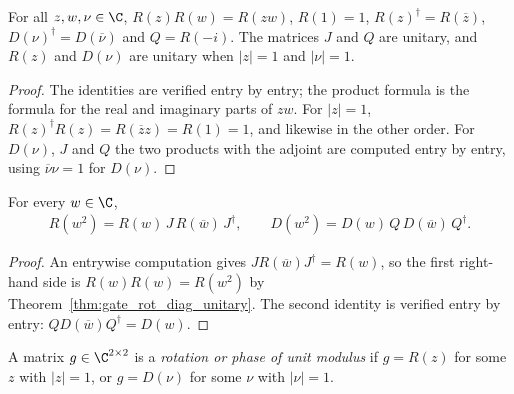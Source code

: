 \begin{theorem}
    \label{thm:gate_rot_diag_unitary}
    \leanok
    For all $z,w,\nu\in\C$,
    $R(z)R(w)=R(zw)$, $R(1)=1$, $R(z)^\dagger=R(\overline z)$,
    $D(\nu)^\dagger=D(\overline\nu)$ and $Q=R(-i)$. The matrices $J$ and $Q$
    are unitary, and $R(z)$ and $D(\nu)$ are unitary when $|z|=1$ and
    $|\nu|=1$.
\end{theorem}
\begin{proof}\leanok
    The identities are verified entry by entry; the product formula is the
    formula for the real and imaginary parts of $zw$. For $|z|=1$,
    $R(z)^\dagger R(z)=R(\overline zz)=R(1)=1$, and likewise in the other
    order. For $D(\nu)$, $J$ and $Q$ the two products with the adjoint are
    computed entry by entry, using $\overline\nu\nu=1$ for $D(\nu)$.
\end{proof}

\begin{theorem}
    \label{thm:gate_sq_commutator}
    \leanok
    For every $w\in\C$,
    \begin{align}
        R(w^2)=R(w)\,J\,R(\overline w)\,J^\dagger,
        \qquad
        D(w^2)=D(w)\,Q\,D(\overline w)\,Q^\dagger.
    \end{align}
\end{theorem}
\begin{proof}\leanok
    An entrywise computation gives $JR(\overline w)J^\dagger=R(w)$, so the
    first right-hand side is $R(w)R(w)=R(w^2)$ by
    Theorem~\ref{thm:gate_rot_diag_unitary}. The second identity is verified
    entry by entry: $QD(\overline w)Q^\dagger=D(w)$.
\end{proof}

\begin{definition}
    \label{def:gate_special_two}
    \leanok
    A matrix $g\in\C^{2\times2}$ is a \emph{rotation or phase of unit
    modulus} if $g=R(z)$ for some $z$ with $|z|=1$, or $g=D(\nu)$ for some
    $\nu$ with $|\nu|=1$.
\end{definition}


